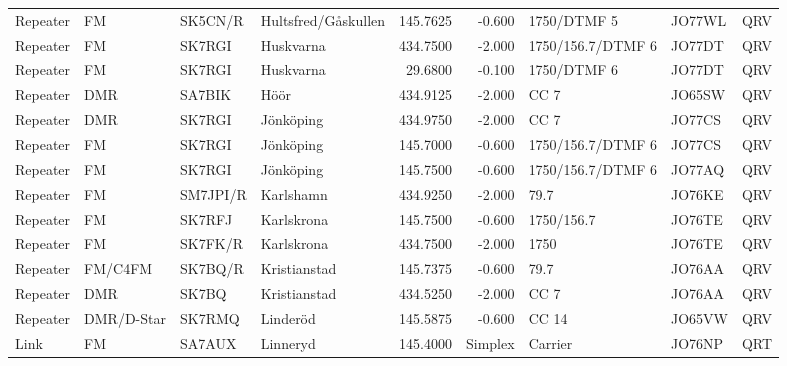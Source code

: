 {\begin{landscape}
\begin{longtable}{llllrrlll}
	Repeater          & FM              & SK5CN/R  & Hultsfred/Gåskullen  &     145.7625 &     -0.600 & 1750/DTMF 5       & JO77WL      & QRV      \\
	Repeater          & FM              & SK7RGI   & Huskvarna            &     434.7500 &     -2.000 & 1750/156.7/DTMF 6 & JO77DT      & QRV      \\
	Repeater          & FM              & SK7RGI   & Huskvarna            &      29.6800 &     -0.100 & 1750/DTMF 6       & JO77DT      & QRV      \\
	Repeater          & DMR             & SA7BIK   & Höör                 &     434.9125 &     -2.000 & CC 7              & JO65SW      & QRV      \\
	Repeater          & DMR             & SK7RGI   & Jönköping            &     434.9750 &     -2.000 & CC 7              & JO77CS      & QRV      \\
	Repeater          & FM              & SK7RGI   & Jönköping            &     145.7000 &     -0.600 & 1750/156.7/DTMF 6 & JO77CS      & QRV      \\
	Repeater          & FM              & SK7RGI   & Jönköping            &     145.7500 &     -0.600 & 1750/156.7/DTMF 6 & JO77AQ      & QRV      \\
	Repeater          & FM              & SM7JPI/R & Karlshamn            &     434.9250 &     -2.000 & 79.7              & JO76KE      & QRV      \\
	Repeater          & FM              & SK7RFJ   & Karlskrona           &     145.7500 &     -0.600 & 1750/156.7        & JO76TE      & QRV      \\
	Repeater          & FM              & SK7FK/R  & Karlskrona           &     434.7500 &     -2.000 & 1750              & JO76TE      & QRV      \\
	Repeater          & FM/C4FM         & SK7BQ/R  & Kristianstad         &     145.7375 &     -0.600 & 79.7              & JO76AA      & QRV      \\
	Repeater          & DMR             & SK7BQ    & Kristianstad         &     434.5250 &     -2.000 & CC 7              & JO76AA      & QRV      \\
	Repeater          & DMR/D-Star      & SK7RMQ   & Linderöd             &     145.5875 &     -0.600 & CC 14             & JO65VW      & QRV      \\
	Link              & FM              & SA7AUX   & Linneryd             &     145.4000 &    Simplex & Carrier           & JO76NP      & QRT      \\

\end{longtable}
\end{landscape}}
